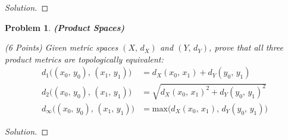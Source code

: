 \documentclass{article}
\theoremstyle{normal}
\newtheorem{problem}{Problem}
\begin{document}
    \color{black}
    \begin{proof}[Solution]
    \end{proof}
    \newpage
    \color{blue}
    \begin{problem}
        \textbf{(Product Spaces)}
        \par\hfill\par
        (6 Points) Given metric spaces $(X,\,d_{X})$
        and $(Y,\,d_{Y})$, prove that all three product metrics are
        topologically equivalent:
        \begin{align}
            d_{1}\big((x_{0},\,y_{0}),\,(x_{1},\,y_{1})\big)
                &=d_{X}(x_{0},\,x_{1})+d_{Y}(y_{0},\,y_{1})\\
            d_{2}\big((x_{0},\,y_{0}),\,(x_{1},\,y_{1})\big)
                &=\sqrt{d_{X}(x_{0},\,x_{1})^{2}+d_{Y}(y_{0},\,y_{1})^{2}}\\
            d_{\infty}\big((x_{0},\,y_{0}),\,(x_{1},\,y_{1})\big)
                &=\textrm{max}\big(%
                    d_{X}(x_{0},\,x_{1}),\,d_{Y}(y_{0},\,y_{1})
                \big)
        \end{align}
    \end{problem}
    \color{black}
    \begin{proof}[Solution]
    \end{proof}
\end{document}
